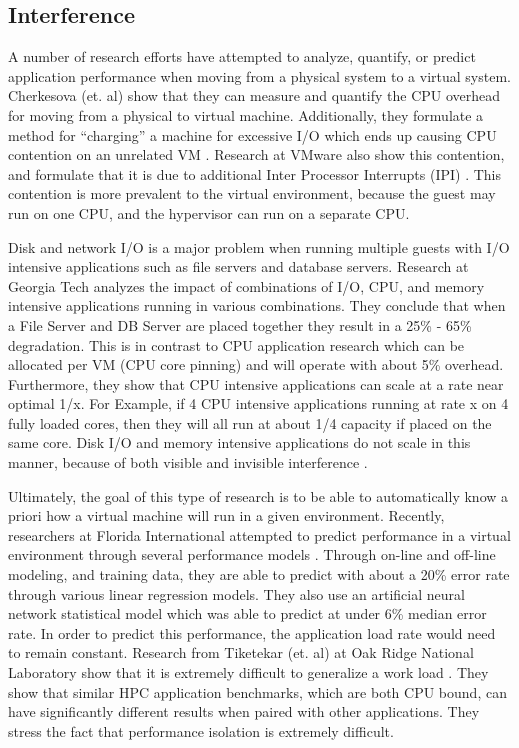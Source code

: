 \subsection{Interference}
A number of research efforts have attempted to analyze, quantify, or predict application performance when moving from a physical system to a virtual system.   Cherkesova (et. al) show that they can measure and quantify the CPU overhead for moving from a physical to virtual machine.  Additionally, they formulate a method for “charging” a machine for excessive I/O which ends up causing CPU contention on an unrelated VM \cite{cherkasova}.  Research at VMware also show this contention, and formulate that it is due to additional Inter Processor Interrupts (IPI) \cite{ahmad}.   This contention is more prevalent to the virtual environment, because the guest may run on one CPU, and the hypervisor can run on a separate CPU. 
 
\indent Disk and network I/O is a major problem when running multiple guests with I/O intensive applications such as file servers and database servers.  Research at Georgia Tech \cite{paul} analyzes the impact of combinations of I/O, CPU, and memory intensive applications running in various combinations.  They conclude that when a File Server and DB Server are placed together they result in a 25\% - 65\% degradation.  This is in contrast to CPU application research \cite{huber1, huber2} which can be allocated per VM (CPU core pinning) and will operate with about 5\% overhead.  Furthermore, they show that CPU intensive applications can scale at a rate near optimal 1/x.   For Example, if 4 CPU intensive applications running at rate x on 4 fully loaded cores, then they will all run at about 1/4 capacity if placed on the same core.   Disk I/O and memory intensive applications do not scale in this manner, because of both visible and invisible interference \cite{tickoo}.

\indent Ultimately, the goal of this type of research is to be able to automatically know a priori how a virtual machine will run in a given environment.  Recently, researchers at Florida International attempted to predict performance in a virtual environment through several performance models \cite{kundu}.  Through on-line and off-line modeling, and training data, they are able to predict with about a 20\% error rate through various linear regression models.  They also use an artificial neural network statistical model which was able to predict at under 6\% median error rate.   In order to predict this performance, the application load rate would need to remain constant.  Research from Tiketekar (et. al) at Oak Ridge National Laboratory show that it is extremely difficult to generalize a work load \cite{tikotekar}.  They show that similar HPC application benchmarks, which are both CPU bound, can have significantly different results when paired with other applications.  They stress the fact that performance isolation is extremely difficult.

